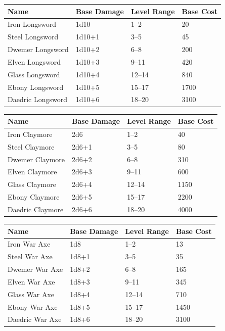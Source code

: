 \documentclass[12pt]{book}
\begin{document}
\begin{tabular}{|p{}|p{}|p{}|p{}|}
\hline
Name & Base Damage & Level Range & Base Cost\\ \hline
Iron Longsword & 1d10 & 1--2 & 20\\ \hline
Steel Longsword & 1d10+1 & 3--5 & 45\\ \hline
Dwemer Longsword & 1d10+2 & 6--8 & 200\\ \hline
Elven Longsword & 1d10+3 & 9--11 & 420\\ \hline
Glass Longsword & 1d10+4 & 12--14 & 840\\ \hline
Ebony Longsword & 1d10+5 & 15--17 & 1700\\ \hline
Daedric Longsword & 1d10+6 & 18--20 & 3100\\ \hline
\end{tabular}

\begin{tabular}{|p{}|p{}|p{}|p{}|}
\hline
Name & Base Damage & Level Range & Base Cost\\ \hline
Iron Claymore & 2d6 & 1--2 & 40\\ \hline
Steel Claymore & 2d6+1 & 3--5 & 80\\ \hline
Dwemer Claymore & 2d6+2 & 6--8 & 310\\ \hline
Elven Claymore & 2d6+3 & 9--11 & 600\\ \hline
Glass Claymore & 2d6+4 & 12--14 & 1150\\ \hline
Ebony Claymore & 2d6+5 & 15--17 & 2200\\ \hline
Daedric Claymore & 2d6+6 & 18--20 & 4000\\ \hline
\end{tabular}

\begin{tabular}{|p{}|p{}|p{}|p{}|}
\hline
Name & Base Damage & Level Range & Base Cost\\ \hline
Iron War Axe & 1d8 & 1--2 & 13\\ \hline
Steel War Axe & 1d8+1 & 3--5 & 35\\ \hline
Dwemer War Axe & 1d8+2 & 6--8 & 165\\ \hline
Elven War Axe & 1d8+3 & 9--11 & 345\\ \hline
Glass War Axe & 1d8+4 & 12--14 & 710\\ \hline
Ebony War Axe & 1d8+5 & 15--17 & 1450\\ \hline
Daedric War Axe & 1d8+6 & 18--20 & 3100\\ \hline
\end{tabular}
\end{document}
